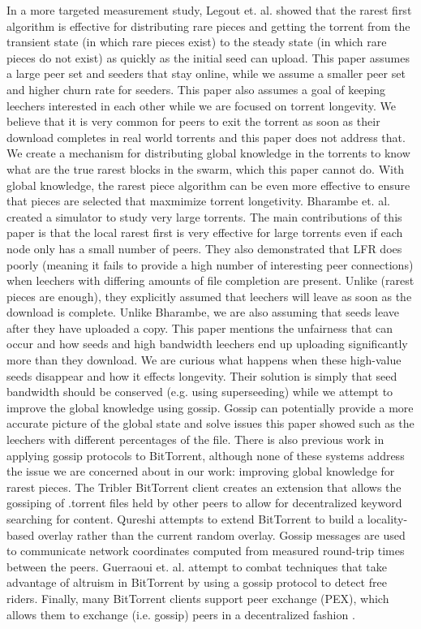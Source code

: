 In a more targeted measurement study, Legout et. al. \cite{legout:1} showed
that the rarest first algorithm is effective for distributing rare
pieces and getting the torrent from the transient state (in which
rare pieces exist) to the steady state (in which rare pieces do not
exist) as quickly as the initial seed can upload. This paper assumes
a large peer set and seeders that stay online, while we assume a
smaller peer set and higher churn rate for seeders. This paper also
assumes a goal of keeping leechers interested in each other while we
are focused on torrent longevity. We believe that it is very common
for peers to exit the torrent as soon as their download completes in
real world torrents and this paper does not address that. We create
a mechanism for distributing global knowledge in the torrents to
know what are the true rarest blocks in the swarm, which this paper
cannot do. With global knowledge, the rarest piece algorithm can be
even more effective to ensure that pieces are selected that maxmimize
torrent longetivity.  Bharambe et. al. \cite{bharambe} created a simulator to
study very large torrents. The main contributions of this paper is
that the local rarest first is very effective for large torrents even
if each node only has a small number of peers. They also demonstrated
that LFR does poorly (meaning it fails to provide a high number of
interesting peer connections) when leechers with differing amounts
of file completion are present. Unlike (rarest pieces are enough),
they explicitly assumed that leechers will leave as soon as the
download is complete. Unlike Bharambe, we are also assuming that seeds
leave after they have uploaded a copy. This paper mentions the
unfairness that can occur and how seeds and high bandwidth leechers
end up uploading significantly more than they download. We are
curious what happens when these high-value seeds disappear and how
it effects longevity. Their solution is simply that seed bandwidth
should be conserved (e.g. using superseeding) while we attempt to
improve the global knowledge using gossip. Gossip can potentially
provide a more accurate picture of the global state and solve issues
this paper showed such as the leechers with different percentages of
the file.  There is also previous work in applying gossip protocols to
BitTorrent, although none of these systems address the issue we are
concerned about in our work: improving global knowledge for rarest
pieces. The Tribler BitTorrent \cite{tribler} client creates an extension
that allows the gossiping of .torrent files held by other peers
to allow for decentralized keyword searching for content. Qureshi
\cite{proximity} attempts to extend BitTorrent to build a locality-based overlay
rather than the current random overlay. Gossip messages are used to
communicate network coordinates computed from measured round-trip
times between the peers. Guerraoui et. al. \cite{freerider} attempt to combat
techniques that take advantage of altruism in BitTorrent by using
a gossip protocol to detect free riders. Finally, many BitTorrent
clients support peer exchange (PEX), which allows them to exchange
(i.e. gossip) peers in a decentralized fashion \cite{pex}.
